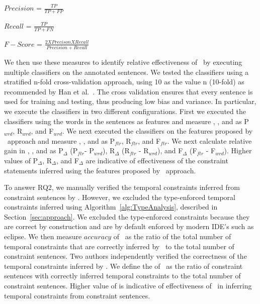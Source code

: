 \begin{center}

$Precision$ = $\frac{TP}{TP + FP}$

$Recall$ = $\frac{TP}{TP + FN}$

$F-Score$ = $\frac{2 X Precison X Recall}{Precision + Recall}$
\end{center}

We then use these measures to identify relative effectiveness of \tool\ by executing multiple classifiers on the annotated sentences.
We tested the classifiers using a stratified n-fold cross-validation approach,
using 10 as the value n (10-fold) as recommended by Han et al.~\cite{han2006data}.
The cross validation ensures that every sentence is used for training and testing,
thus producing low bias and variance.
In particular, we execute the classifiers in two different configurations.
First we executed the classifiers using the words in the sentences as features and measure , , and  as P$_{wrd}$, R$_{wrd}$, and F$_{wrd}$.
We next executed the classifiers on the features proposed by \tool\ approach and measure , , and  as P$_{ftr}$, R$_{ftr}$, and F$_{ftr}$.
We next calculate relative gain in , , and  as P$_{\Delta}$ (P$_{ftr}$- P$_{wrd}$), R$_{\Delta}$ (R$_{ftr}$ - R$_{wrd}$), and F$_{\Delta}$ (F$_{ftr}$ - F$_{wrd}$). 
Higher values of P$_{\Delta}$, R$_{\Delta}$, and F$_{\Delta}$ are indicative of effectiveness of the constraint statements inferred using the features proposed by \tool\ approach.


To answer RQ2, we manually verified the temporal constraints inferred from constraint sentences by \tool.
However, we excluded the type-enforced temporal constraints inferred using Algorithm~\ref{alg:TypeAnalysis}, described in Section~\ref{sec:approach}.
We excluded the type-enforced constraints because they are correct by construction and are by default enforced by modern IDE's such as eclipse. 
We then measure $accuracy$ of \tool\ as the ratio of the total number of temporal constraints that
are correctly inferred by \tool\ to the total number of constraint sentences. Two authors
independently verified the correctness of the temporal constraints inferred by \tool.
We define the  of \tool\ as the ratio of constraint sentences with correctly inferred temporal constraints
to the total number of constraint sentences. 
Higher value of  is indicative of effectiveness of \tool\ in inferring temporal constraints from constraint sentences.


